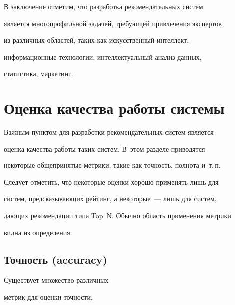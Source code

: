 В заключение отметим, что разработка рекомендательных систем


является многопрофильной задачей, требующей привлечения экспертов


из различных областей, таких как искусственный интеллект,


информационные технологии, интеллектуальный анализ данных,


статистика, маркетинг.





\section{Оценка качества работы системы}





Важным пунктом для разработки рекомендательных систем является


оценка качества работы таких систем. В~этом разделе приводятся


некоторые общепринятые метрики, такие как точность, полнота и~т.\,п.





Следует отметить, что некоторые оценки хорошо применять лишь для


сис\-тем, предсказывающих рейтинг, а некоторые~--- лишь для сис\-тем,


дающих рекомендации типа Top~N. Обычно область применения метрики


видна из определения.





\subsection{Точность (accuracy)} Существует множество различных


метрик для оценки точности.


